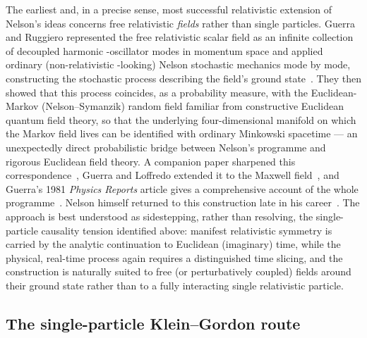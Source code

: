 \documentclass[11pt]{article}
\begin{document}
The earliest and, in a precise sense, most successful relativistic
extension of Nelson's ideas concerns free relativistic \emph{fields} rather
than single particles. Guerra and Ruggiero represented the free
relativistic scalar field as an infinite collection of decoupled harmonic
-oscillator modes in momentum space and applied ordinary (non-relativistic
-looking) Nelson stochastic mechanics mode by mode, constructing the
stochastic process describing the field's ground
state~\cite{guerraruggiero73}. They then showed that this process
coincides, as a probability measure, with the Euclidean-Markov 
(Nelson--Symanzik) random field familiar from constructive Euclidean
quantum field theory, so that the underlying four-dimensional manifold on
which the Markov field lives can be identified with ordinary Minkowski
spacetime --- an unexpectedly direct probabilistic bridge between Nelson's
programme and rigorous Euclidean field theory. A companion paper sharpened
this correspondence~\cite{guerraruggiero78}, Guerra and Loffredo extended
it to the Maxwell field~\cite{guerraloffredo80}, and Guerra's 1981
\emph{Physics Reports} article gives a comprehensive account of the whole
programme~\cite{guerra81}. Nelson himself returned to this construction
late in his career~\cite{nelson2014}. The approach is best understood as
sidestepping, rather than resolving, the single-particle causality tension
identified above: manifest relativistic symmetry is carried by the analytic
continuation to Euclidean (imaginary) time, while the physical, real-time
process again requires a distinguished time slicing, and the construction
is naturally suited to free (or perturbatively coupled) fields around their
ground state rather than to a fully interacting single relativistic
particle.

\subsection{The single-particle Klein--Gordon route}
\end{document}
